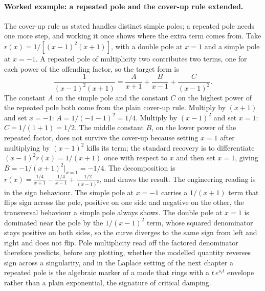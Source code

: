 

\paragraph{Worked example: a repeated pole and the cover-up rule
extended.}
The cover-up rule as stated handles distinct simple poles; a repeated
pole needs one more step, and working it once shows where the extra term
comes from. Take $r(x) = 1/[(x - 1)^{2}(x + 1)]$, with a double pole at
$x = 1$ and a simple pole at $x = -1$. A repeated pole of multiplicity
two contributes two terms, one for each power of the offending factor,
so the target form is
\[
  \frac{1}{(x - 1)^{2}(x + 1)}
  = \frac{A}{x + 1} + \frac{B}{x - 1} + \frac{C}{(x - 1)^{2}}.
\]
The constant $A$ on the simple pole and the constant $C$ on the highest
power of the repeated pole both come from the plain cover-up rule.
Multiply by $(x + 1)$ and set $x = -1$: $A = 1/(-1 - 1)^{2} = 1/4$.
Multiply by $(x - 1)^{2}$ and set $x = 1$: $C = 1/(1 + 1) = 1/2$. The
middle constant $B$, on the lower power of the repeated factor, does not
survive the cover-up because setting $x = 1$ after multiplying by
$(x - 1)^{2}$ kills its term; the standard recovery is to differentiate
$(x - 1)^{2} r(x) = 1/(x + 1)$ once with respect to $x$ and then set
$x = 1$, giving $B = -1/(x + 1)^{2}\big|_{x = 1} = -1/4$. The
decomposition is $r(x) = \tfrac{1/4}{x + 1} - \tfrac{1/4}{x - 1} +
\tfrac{1/2}{(x - 1)^{2}}$, and
 draws the result. The engineering
reading is in the sign behaviour. The simple pole at $x = -1$ carries a
$1/(x + 1)$ term that flips sign across the pole, positive on one side
and negative on the other, the transversal behaviour a simple pole
always shows. The double pole at $x = 1$ is dominated near the pole by
the $1/(x - 1)^{2}$ term, whose squared denominator stays positive on
both sides, so the curve diverges to the same sign from left and right
and does not flip. Pole multiplicity read off the factored denominator
therefore predicts, before any plotting, whether the modelled quantity
reverses sign across a singularity, and in the Laplace setting of the
next chapter a repeated pole is the algebraic marker of a mode that
rings with a $t\,e^{s_i t}$ envelope rather than a plain exponential,
the signature of critical damping.



